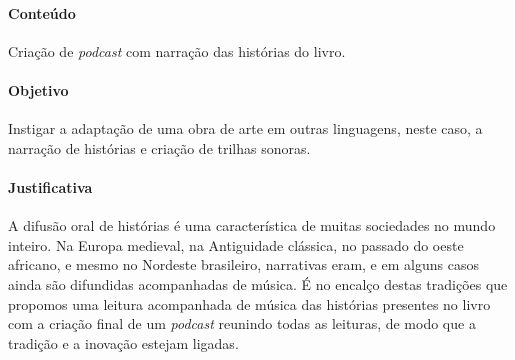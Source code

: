 \documentclass[12pt]{extarticle}
\begin{document}
 \paragraph{Conteúdo} Criação de \textit{podcast} com narração das histórias do livro.

 \paragraph{Objetivo} Instigar a adaptação de uma obra de arte em outras linguagens, neste
 caso, a narração de histórias e criação de trilhas sonoras. 


 \paragraph{Justificativa} A difusão oral de histórias é uma característica de
 muitas sociedades no mundo inteiro. Na Europa medieval, na Antiguidade clássica,
 no passado do oeste africano, e mesmo no Nordeste brasileiro, narrativas eram, e em alguns
 casos ainda são difundidas acompanhadas de música. 
 É no encalço destas tradições que propomos uma leitura acompanhada de música
 das histórias presentes no livro com a criação final de um \textit{podcast} reunindo todas
 as leituras, de modo que a tradição e a inovação estejam ligadas.   
\end{document}
